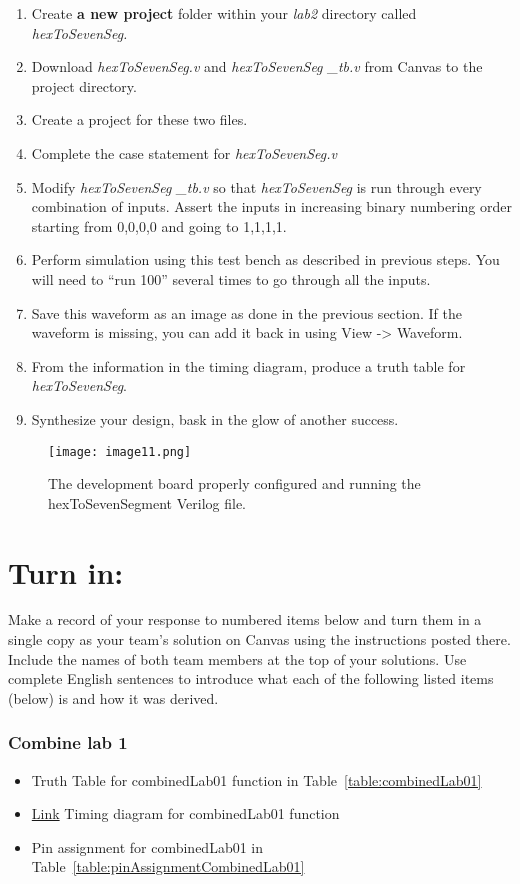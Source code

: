 \begin{enumerate}
\item
  Create \textbf{a new project} folder within your \emph{lab2} directory
  called \emph{hexToSevenSeg.}
\item
  Download \emph{hexToSevenSeg.v} and \emph{hexToSevenSeg \_tb.v} from
  Canvas to the project directory.
\item
  Create a project for these two files.
\item
  \protect\hypertarget{Hex2Seven_Verilog}{}{}Complete the case statement
  for \emph{hexToSevenSeg.v}
\item
  Modify \emph{hexToSevenSeg \_tb.v} so that \emph{hexToSevenSeg} is run
  through every combination of inputs. Assert the inputs in increasing
  binary numbering order starting from 0,0,0,0 and going to 1,1,1,1.
\item
  Perform simulation using this test bench as described in previous
  steps. You will need to ``run 100'' several times to go through all
  the inputs.
\item
  \protect\hypertarget{Hex2Seven_Waveform}{}{}Save this waveform as an
  image as done in the previous section. If the waveform is missing, you
  can add it back in using View -\textgreater{} Waveform.
\item
  From the information in the timing diagram, produce a truth table for
  \emph{hexToSevenSeg}.
\item
  Synthesize your design, bask in the glow of another success.
\end{enumerate}

\begin{figure}[ht]
\texttt{[image: image11.png]}
\caption{The development board properly configured and running the hexToSevenSegment Verilog file.}
\end{figure}

\hypertarget{turn-in}{%
\section{Turn in:}\label{section:h27turn-in}}

Make a record of your response to numbered items below and turn them in
a single copy as your team's solution on Canvas using the instructions
posted there. Include the names of both team members at the top of your
solutions. Use complete English sentences to introduce what each of the
following listed items (below) is and how it was derived.

\subsubsection{Combine lab 1} 
\begin{itemize}
\item Truth Table for combinedLab01 function in Table~\ref{table:combinedLab01}
\item \protect\hyperlink{CombinedLab01_Waveform}{Link} Timing diagram for combinedLab01 function
\item  Pin assignment for combinedLab01 in Table~\ref{table:pinAssignmentCombinedLab01}
\end{itemize}

